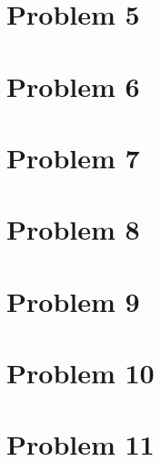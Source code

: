 \documentclass{article}
\begin{document}

\section*{Problem 5}





\section*{Problem 6}





\section*{Problem 7}





\section*{Problem 8}





\section*{Problem 9}





\section*{Problem 10}





\section*{Problem 11}
\end{document}
